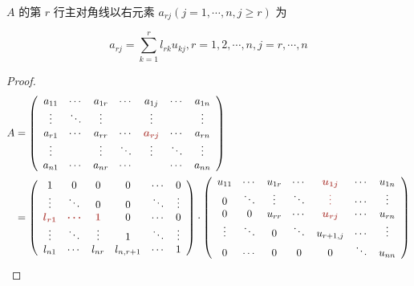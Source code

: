 \begin{theorem}
    $ A $ 的第 $ r $ 行主对角线以右元素 $ a_{r j}(j=1, \cdots, n, j \ge r) $ 为

    \begin{equation}a_{r j}=\sum_{k=1}^{r} l_{r k} u_{k j}, r=1,2, \cdots, n,j=r, \cdots, n \end{equation}
\end{theorem}

\begin{proof}
    \begin{equation}
        \begin{aligned}
            A & =\left(\begin{array}{ c c c c c c c }
            a_{11} & \cdots  & a_{1r} & \cdots  & a_{1j} & \cdots  & a_{1n}\\
            \vdots  & \ddots  & \vdots  &  & \vdots  &  & \vdots \\
            a_{r1} & \cdots  & a_{rr} & \cdots  & \boldsymbol{\textcolor[rgb]{0.72,0.33,0.31}{a}\textcolor[rgb]{0.72,0.33,0.31}{_{rj}}} & \cdots  & a_{rn}\\
            \vdots  &  & \vdots  & \ddots  & \vdots  & \ddots  & \vdots \\
            a_{n1} & \cdots  & a_{nr} & \cdots  &  & \cdots  & a_{nn}
            \end{array}\right)\\
             & =\left(\begin{array}{ c c c c c c }
            1 & 0 & 0 & 0 & \cdots  & 0\\
            \vdots  & \ddots  & 0 & 0 & \ddots  & \vdots \\
            \boldsymbol{\textcolor[rgb]{0.72,0.33,0.31}{l}\textcolor[rgb]{0.72,0.33,0.31}{_{r1}}} & \boldsymbol{\textcolor[rgb]{0.72,0.33,0.31}{\cdots }} & \boldsymbol{\textcolor[rgb]{0.72,0.33,0.31}{1}} & 0 & \cdots  & 0\\
            \vdots  & \ddots  & \vdots  & 1 & \ddots  & \vdots \\
            l_{n1} & \cdots  & l_{nr} & l_{n,r+1} & \cdots  & 1
            \end{array}\right) \cdot \left(\begin{array}{ c c c c c c c }
            u_{11} & \cdots  & u_{1r} & \cdots  & \boldsymbol{\textcolor[rgb]{0.72,0.33,0.31}{u}\textcolor[rgb]{0.72,0.33,0.31}{_{1j}}} & \cdots  & u_{1n}\\
            0 & \ddots  & \vdots  & \ddots  & \boldsymbol{\textcolor[rgb]{0.72,0.33,0.31}{\vdots }} & \cdots  & \vdots \\
            0 & 0 & u_{rr} & \cdots  & \boldsymbol{\textcolor[rgb]{0.72,0.33,0.31}{u}\textcolor[rgb]{0.72,0.33,0.31}{_{rj}}} & \cdots  & u_{rn}\\
            \vdots  & \ddots  & 0 & \ddots  & u_{r+1,j} & \cdots  & \vdots \\
            0 & \cdots  & 0 & 0 & 0 & \ddots  & u_{nn}
            \end{array}\right)
            \end{aligned}
    \end{equation}


\end{proof}
